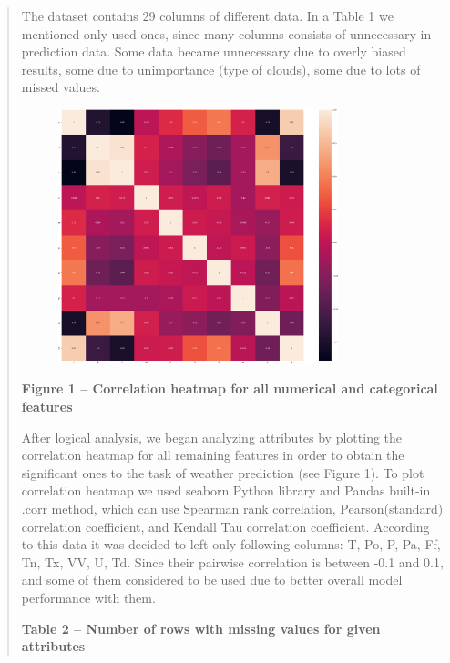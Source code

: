 \begin{quote}
The dataset contains 29 columns of different data. In a Table 1 we
mentioned only used ones, since many columns consists of unnecessary in
prediction data. Some data became unnecessary due to overly biased
results, some due to unimportance (type of clouds), some due to lots of
missed values.

\begin{figure}[H]
	\centering
	\includegraphics[width=0.8\textwidth]{assets/36}
	\caption*{}
\end{figure}

\textbf{Figure 1 -- Correlation heatmap for all numerical and
categorical features}

After logical analysis, we began analyzing attributes by plotting the
correlation heatmap for all remaining features in order to obtain the
significant ones to the task of weather prediction (see Figure 1). To
plot correlation heatmap we used seaborn Python library and Pandas
built-in .corr method, which can use Spearman rank correlation,
Pearson(standard) correlation coefficient, and Kendall Tau correlation
coefficient. According to this data it was decided to left only
following columns: \textquotesingle T\textquotesingle,
\textquotesingle Po\textquotesingle, \textquotesingle P\textquotesingle,
\textquotesingle Pa\textquotesingle,
\textquotesingle Ff\textquotesingle,
\textquotesingle Tn\textquotesingle,
\textquotesingle Tx\textquotesingle,
\textquotesingle VV\textquotesingle, \textquotesingle U\textquotesingle,
\textquotesingle Td\textquotesingle. Since their pairwise correlation is
between -0.1 and 0.1, and some of them considered to be used due to
better overall model performance with them.

\textbf{Table 2 -- Number of rows with missing values for given
attributes}
\end{quote}

